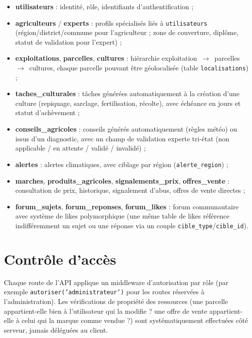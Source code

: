 \documentclass[12pt,a4paper]{report}
\begin{document}
\begin{itemize}
    \item \textbf{utilisateurs} : identité, rôle, identifiants d'authentification ;
    \item \textbf{agriculteurs} / \textbf{experts} : profils spécialisés liés à \texttt{utilisateurs} (région/district/commune pour l'agriculteur ; zone de couverture, diplôme, statut de validation pour l'expert) ;
    \item \textbf{exploitations}, \textbf{parcelles}, \textbf{cultures} : hiérarchie exploitation~$\rightarrow$~parcelles~$\rightarrow$~cultures, chaque parcelle pouvant être géolocalisée (table \texttt{localisations}) ;
    \item \textbf{taches\_culturales} : tâches générées automatiquement à la création d'une culture (repiquage, sarclage, fertilisation, récolte), avec échéance en jours et statut d'achèvement ;
    \item \textbf{conseils\_agricoles} : conseils générés automatiquement (règles météo) ou issus d'un diagnostic, avec un champ de validation experte tri-état (non applicable / en attente / validé / invalidé) ;
    \item \textbf{alertes} : alertes climatiques, avec ciblage par région (\texttt{alerte\_region}) ;
    \item \textbf{marches}, \textbf{produits\_agricoles}, \textbf{signalements\_prix}, \textbf{offres\_vente} : consultation de prix, historique, signalement d'abus, offres de vente directes ;
    \item \textbf{forum\_sujets}, \textbf{forum\_reponses}, \textbf{forum\_likes} : forum communautaire avec système de likes polymorphique (une même table de likes référence indifféremment un sujet ou une réponse via un couple \texttt{cible\_type}/\texttt{cible\_id}).
\end{itemize}

\section{Contrôle d'accès}

Chaque route de l'API applique un middleware d'autorisation par rôle (par exemple \texttt{autoriser('administrateur')} pour les routes réservées à l'administration). Les vérifications de propriété des ressources (une parcelle appartient-elle bien à l'utilisateur qui la modifie ? une offre de vente appartient-elle à celui qui la marque comme vendue ?) sont systématiquement effectuées côté serveur, jamais déléguées au client.
\end{document}
